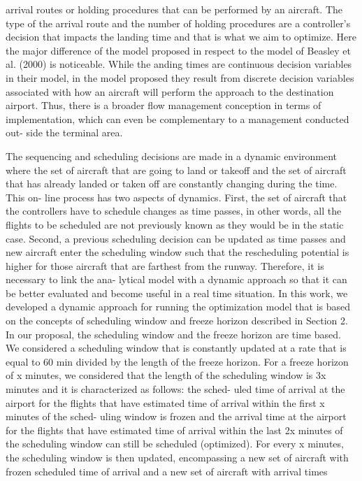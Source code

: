 \documentclass{aer1315-pretty}
\begin{document}
\begin{itemize}
arrival routes or holding procedures that can be performed by an aircraft. The type of the arrival route and the number of
holding procedures are a controller’s decision that impacts the landing time and that is what we aim to optimize.
    Here the major difference of the model proposed in respect to the model of Beasley et al. (2000) is noticeable. While the
 anding times are continuous decision variables in their model, in the model proposed they result from discrete decision variables associated with how an aircraft will perform the approach to the destination airport. Thus, there is a broader ﬂow
management conception in terms of implementation, which can even be complementary to a management conducted out-
side the terminal area.

    The sequencing and scheduling decisions are made in a dynamic environment where the set of aircraft that are going to
land or takeoff and the set of aircraft that has already landed or taken off are constantly changing during the time. This on-
line process has two aspects of dynamics. First, the set of aircraft that the controllers have to schedule changes as time
passes, in other words, all the ﬂights to be scheduled are not previously known as they would be in the static case. Second,
a previous scheduling decision can be updated as time passes and new aircraft enter the scheduling window such that the
rescheduling potential is higher for those aircraft that are farthest from the runway. Therefore, it is necessary to link the ana-
lytical model with a dynamic approach so that it can be better evaluated and become useful in a real time situation. In this
work, we developed a dynamic approach for running the optimization model that is based on the concepts of scheduling
window and freeze horizon described in Section 2.
    In our proposal, the scheduling window and the freeze horizon are time based. We considered a scheduling window that
is constantly updated at a rate that is equal to 60 min divided by the length of the freeze horizon. For a freeze horizon of x
minutes, we considered that the length of the scheduling window is 3x minutes and it is characterized as follows: the sched-
uled time of arrival at the airport for the ﬂights that have estimated time of arrival within the ﬁrst x minutes of the sched-
uling window is frozen and the arrival time at the airport for the ﬂights that have estimated time of arrival within the last 2x
minutes of the scheduling window can still be scheduled (optimized). For every x minutes, the scheduling window is then
updated, encompassing a new set of aircraft with frozen scheduled time of arrival and a new set of aircraft with arrival times

\end{itemize}
\end{document}
